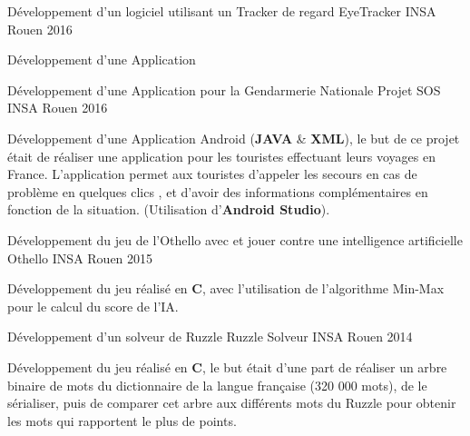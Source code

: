 

\begin{cventries}

  \cventry
	{Développement d'un logiciel utilisant un Tracker de regard} %
	{EyeTracker} %
	{INSA Rouen} %
	{2016} %
	{
		\begin{cvitems} %
			\item {Développement d'une Application}
		\end{cvitems}
	}

  \cventry
	{Développement d'une Application pour la Gendarmerie Nationale} %
	{Projet SOS} %
	{INSA Rouen} %
	{2016} %
	{
		\begin{cvitems} %
			\item {Développement d'une Application Android (\textbf{JAVA} \& \textbf{XML}), le but de ce projet était de réaliser une application pour les touristes effectuant leurs voyages en France. L'application permet aux touristes d'appeler les secours en cas de problème en quelques clics , et d'avoir des informations complémentaires en fonction de la situation. (Utilisation d'\textbf{Android Studio}). }
		\end{cvitems}
	}

  \cventry
	{Développement du jeu de l'Othello avec et jouer contre une intelligence artificielle} %
	{Othello} %
	{INSA Rouen} %
	{2015} %
	{
		\begin{cvitems} %
			\item {Développement du jeu réalisé en \textbf{C}, avec l'utilisation de l'algorithme Min-Max pour le calcul du score de l'IA.}
		\end{cvitems}
	}

  \cventry
	{Développement d'un solveur de Ruzzle} %
	{Ruzzle Solveur} %
	{INSA Rouen} %
	{2014} %
	{
		\begin{cvitems} %
			\item {Développement du jeu réalisé en \textbf{C}, le but était d'une part de réaliser un arbre binaire de mots du dictionnaire de la langue française (320 000 mots), de le sérialiser, puis de comparer cet arbre aux différents mots du Ruzzle pour obtenir les mots qui rapportent le plus de points.}
		\end{cvitems}
	}

\end{cventries}
